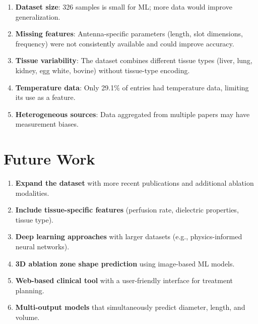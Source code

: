 \begin{enumerate}
    \item \textbf{Dataset size}: 326 samples is small for ML; more data would improve generalization.
    \item \textbf{Missing features}: Antenna-specific parameters (length, slot dimensions, frequency) were not consistently available and could improve accuracy.
    \item \textbf{Tissue variability}: The dataset combines different tissue types (liver, lung, kidney, egg white, bovine) without tissue-type encoding.
    \item \textbf{Temperature data}: Only 29.1\% of entries had temperature data, limiting its use as a feature.
    \item \textbf{Heterogeneous sources}: Data aggregated from multiple papers may have measurement biases.
\end{enumerate}


\section{Future Work}

\begin{enumerate}
    \item \textbf{Expand the dataset} with more recent publications and additional ablation modalities.
    \item \textbf{Include tissue-specific features} (perfusion rate, dielectric properties, tissue type).
    \item \textbf{Deep learning approaches} with larger datasets (e.g., physics-informed neural networks).
    \item \textbf{3D ablation zone shape prediction} using image-based ML models.
    \item \textbf{Web-based clinical tool} with a user-friendly interface for treatment planning.
    \item \textbf{Multi-output models} that simultaneously predict diameter, length, and volume.
\end{enumerate}
